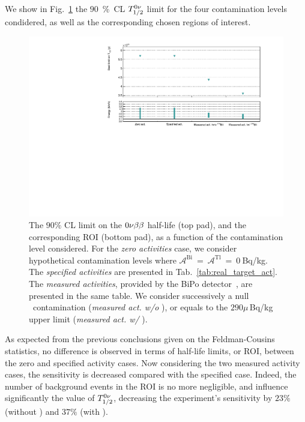 \paragraph{} We show in Fig.~\ref{fig:real_target_act} the $90$~\%~CL $T_{1/2}^{0\nu}$ limit for the four contamination levels condidered, as well as the corresponding chosen regions of interest.
\begin{figure}[h!]
  \centering
  \includegraphics[width=1.1\textwidth]{Sensitivity/fig_sensitivity/contamination_level_Se_B.pdf}
  \caption{The $90\%$ CL limit on the $0\nu\beta\beta$ half-life (top pad), and the corresponding ROI (bottom pad), as a function of the contamination level considered.
    For the \emph{zero activities} case, we consider hypothetical contamination levels where $\mathcal{A}^{\text{Bi}}~=~\mathcal{A}^{\text{Tl}}~=~0~$Bq/kg.
    The \emph{specified activities} are presented in Tab.~\ref{tab:real_target_act}.
    The \emph{measured activities}, provided by the BiPo detector~\cite{internal:bipo}, are presented in the same table.
    We consider successively a null \Bi\ contamination (\emph{measured act. w/o \Bi}), or equals to the $290\mu\,$Bq/kg upper limit (\emph{measured act. w/ \Bi}).
    \label{fig:real_target_act}}
\end{figure}
As expected from the previous conclusions given on the Feldman-Cousins statistics, no difference is observed in terms of half-life limits, or ROI, between the zero and specified activity cases.
Now considering the two measured activity cases, the sensitivity is decreased compared with the specified case.
Indeed, the number of background events in the ROI is no more negligible, and influence significantly the value of $T_{1/2}^{0\nu}$, decreasing the experiment's sensitivity by $23\%$ (without \Bi) and $37\%$ (with \Bi).


